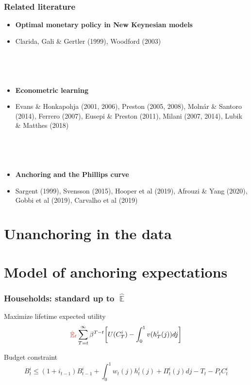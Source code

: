 \documentclass[11pt]{beamer}
\DeclareMathOperator{\E}{\mathbb{E}}
\begin{document}
\begin{frame}
	\frametitle{Related literature}

\begin{itemize}
\item \textbf{Optimal monetary policy in New Keynesian models}
\item[] Clarida, Gali \& Gertler (1999), Woodford (2003)

\

\

\item \textbf{Econometric learning}
\item[] Evans \& Honkapohja (2001, 2006), Preston (2005, 2008), Moln\'ar \& Santoro (2014), Ferrero (2007), Eusepi \& Preston (2011), Milani (2007, 2014), Lubik \& Matthes (2018)

\

\

\item \textbf{Anchoring and the Phillips curve} 
\item[] Sargent (1999), Svensson (2015), Hooper et al (2019), Afrouzi \& Yang (2020), Gobbi et al (2019), Carvalho et al (2019)
\end{itemize}



\end{frame}

\section{Unanchoring in the data}

\section{Model of anchoring expectations}

\begin{frame}
	\frametitle{Households: standard up to $\hat{\E}$}
	\label{HH}

Maximize lifetime expected utility
\begin{equation}
\textcolor{brownreddark}{\hat{\E}_t}\sum^{\infty}_{T=t}\beta^{T-t} \bigg[ U(C^i_T) - \int_0^1 v(h^i_T(j)) dj \bigg]
\label{lifetime_U}
\end{equation}	

Budget constraint
\begin{equation}
 B^i_t \leq (1+i_{t-1})B^i_{t-1} + \int_0^1 w_t(j)h^i_t(j) + \Pi_t^i(j)  dj-T_t -P_tC^i_t
 \label{BC}
\end{equation}



\vfill

\hfill \hyperlink{details_HHs_firms}{}
\end{frame}
\end{document}
